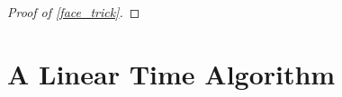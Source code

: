 \documentclass{patmorin}
\begin{document}
\begin{proof}[Proof of \cref{face_trick}]
\end{proof}


\section{A Linear Time Algorithm}




\end{document}
